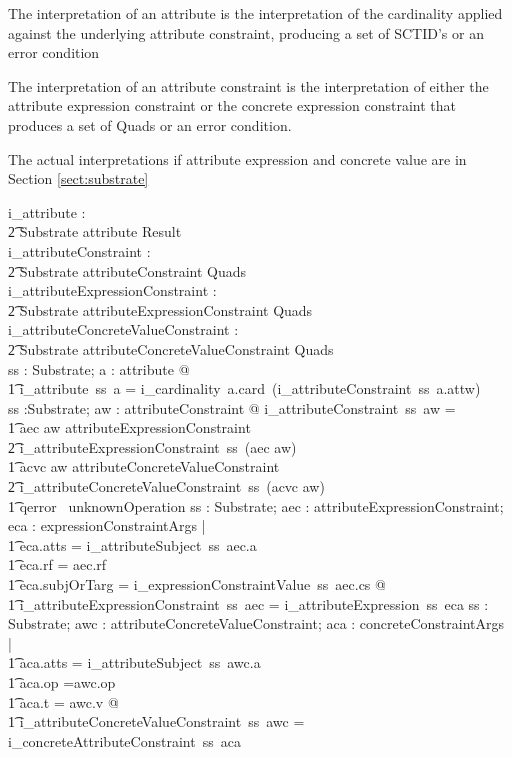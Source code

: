 \documentclass{article}
\begin{document}
The interpretation of an attribute is the interpretation of the cardinality applied against the
underlying attribute constraint, producing a set of SCTID's or an error condition

The interpretation of an attribute constraint is the interpretation of either the attribute expression
constraint or the concrete expression constraint that produces a set of Quads or an error condition.

The actual interpretations if attribute expression and concrete value are in Section \ref{sect:substrate}
\begin{gendef}
   i\_attribute : \\
\t2 Substrate \pfun attribute \pfun Result \\
   i\_attributeConstraint : \\
\t2 Substrate \pfun attributeConstraint \pfun Quads \\
   i\_attributeExpressionConstraint : \\
\t2 Substrate \pfun attributeExpressionConstraint \pfun Quads \\
   i\_attributeConcreteValueConstraint : \\
\t2 Substrate \pfun attributeConcreteValueConstraint \pfun Quads \\
\where
\forall ss : Substrate; a : attribute @ \\
\t1 i\_attribute~ss~a =  i\_cardinality~a.card~(i\_attributeConstraint~ss~a.attw) \\
\also
\forall ss :Substrate; aw : attributeConstraint @ i\_attributeConstraint~ss~aw = \\
\t1 \IF aec \inv aw \in attributeExpressionConstraint \\
\t2  \THEN i\_attributeExpressionConstraint~ss~(aec \inv aw) \\
\t1 \ELSE \IF acvc \inv aw \in attributeConcreteValueConstraint \\
\t2  \THEN i\_attributeConcreteValueConstraint~ss~(acvc \inv aw) \\
\t1 \ELSE qerror~ unknownOperation
 \also
\forall ss : Substrate; aec : attributeExpressionConstraint; eca : expressionConstraintArgs | \\
\t1 eca.atts = i\_attributeSubject~ss~aec.a \land \\
\t1 eca.rf = aec.rf \land \\
\t1 eca.subjOrTarg = i\_expressionConstraintValue~ss~aec.cs @ \\
\t1 i\_attributeExpressionConstraint~ss~aec = i\_attributeExpression~ss~eca
\also 
\forall ss : Substrate; awc : attributeConcreteValueConstraint; aca : concreteConstraintArgs | \\
\t1 aca.atts = i\_attributeSubject~ss~awc.a \land \\
\t1 aca.op =awc.op \land \\
\t1 aca.t = awc.v @ \\
\t1 i\_attributeConcreteValueConstraint~ss~awc = i\_concreteAttributeConstraint~ss~aca \\
\end{gendef}
\end{document}
